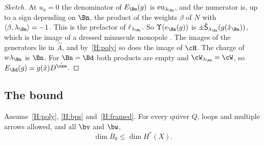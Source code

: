 \begin{proof}[Sketch]
At $u_a=0$ the denominator of $E_\Bn(g)$ is $\mathrm{eu}_{\lambda_\Bn}$, and the
numerator is, up to a sign depending on $\Bn$, the product of the weights
$\beta$ of $N$ with $\langle\beta,\lambda_\Bn\rangle=-1$.  This is the
prefactor of $\hat r_{\lambda_\Bn}$.  So $\Upsilon(e_\Bn(g))$ is
$\pm\hat{\mathsf S}_{\lambda_\Bn}(g(\hat x_\Bn))$, which is the image of a dressed
minuscule monopole \cite[Prop.~6.6]{BFN}.  The images of the generators lie
in $\hat A$, and by~\ref{H:poly} so does the image of $\cH$.  The charge of
$w\lambda_\Bn$ is $\Bn$.  For $\Bn=\Bd$ both products are empty and
$\cW_{\lambda_\Bd}=\cW$, so $E_\Bd(g)=g(\hat x)D^{\hat\one}$.
\end{proof}


\subsection{The bound}\label{ss:bps-bound}

\begin{theorem}\label{thm:bps}
Assume~\ref{H:poly}, \ref{H:bps} and~\ref{H:framed}.  For every quiver $Q$,
loops and multiple arrows allowed, and all $\bv$ and $\bw$,
\[
 \dim B_0\le\dim H^*(X).
\]
\end{theorem}


